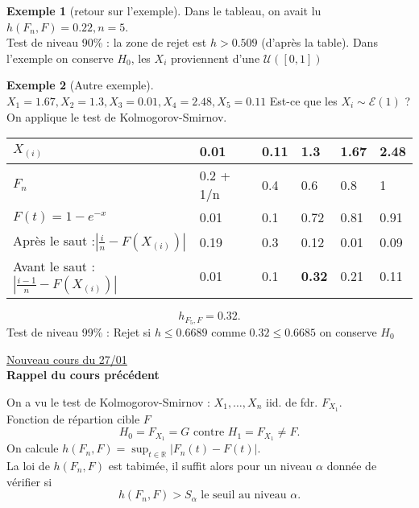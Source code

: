 \documentclass{article}
\theoremstyle{plain}%
\theoremstyle{definition}
\newtheorem{exmp}{Exemple}[section]
\theoremstyle{remark}
\begin{document}
\begin{exmp}[retour sur l'exemple]
    Dans le tableau, on avait lu $ h(F_n, F) = 0.22, n=5 $. \\
    Test de niveau 90\% : la zone de rejet est $ h > 0.509 $ (d'après la table). Dans l'exemple on conserve $ H_0 $, les $ X_i $ proviennent d'une $ \mathcal{U}([0,1]) $ 
\end{exmp}

\begin{exmp}[Autre exemple]
    $ X_1 = 1.67, X_2= 1.3, X_3=0.01, X_4=2.48, X_5=0.11 $ Est-ce que les $ X_i \sim \mathcal{E}(1) $ ? On applique le test de Kolmogorov-Smirnov. 
    \begin{table}[!ht]
        \centering
        \begin{tabular}{|l|l|l|l|l|l|}
        \hline
            $X_{(i)}$ & 0.01 & 0.11 & 1.3 & 1.67 & 2.48 \\ \hline
            $F_n$ & 0.2  + 1/n & 0.4 & 0.6 & 0.8 & 1 \\ \hline
            $F(t) = 1 - e^{-x}$ & 0.01 & 0.1 & 0.72 & 0.81 & 0.91 \\ \hline
            Après le saut :$\left| \frac{i}{n} - F(X_{(i)}) \right|$ & 0.19 & 0.3 & 0.12 & 0.01 & 0.09 \\ \hline
            Avant le saut : $\left| \frac{i-1}{n}- F(X_{(i)}) \right|$ & 0.01 & 0.1 & \textbf{0.32} & 0.21 & 0.11 \\ \hline
        \end{tabular}
        \label{tab2}
    \end{table}
    \[
        h_{F_5,F} = 0.32
    .\]
    Test de niveau 99\% : Rejet si $ h \leq 0.6689 $ comme $ 0.32 \leq 0.6685 $ on conserve $ H_0 $ 
\end{exmp}

\underline{Nouveau cours du 27/01} \\

\textbf{Rappel du cours précédent}

On a vu le test de Kolmogorov-Smirnov : $ X_1, \dots, X_n $ iid. de fdr. $ F_{X_1} $. \\
Fonction de répartion cible $ F $ 
\[
    H_0 = F_{X_1} = G \text{ contre } H_1 = F_{X_1} \neq F
.\]
On calcule $ h(F_n, F) = \sup _{t \in \mathbb{R}} \left| F_n(t) - F(t) \right| $. \\
La loi de $ h(F_n, F) $ est tabimée, il suffit alors pour un niveau $ \alpha  $ donnée de vérifier si 
\[
    h(F_n, F) > S_\alpha \text{ le seuil au niveau } \alpha 
.\]
\end{document}

